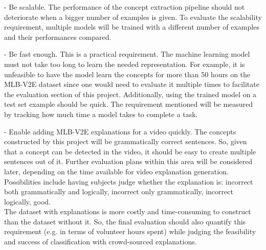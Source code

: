  - Be scalable. The performance of the concept extraction pipeline should not deteriorate when a bigger number of examples is given. To evaluate the scalability requirement, multiple models will be trained with a different number of examples and their performances compared.
 
 - Be fast enough. This is a practical requirement. The machine learning model must not take too long to learn the needed representation. For example, it is unfeasible to have the model learn the concepts for more than 50 hours on the MLB-V2E dataset since one would need to evaluate it multiple times to facilitate the evaluation section of this project. Additionally, using the trained model on a test set example should be quick. The requirement mentioned will be measured by tracking how much time a model takes to complete a task.
 
 - Enable adding MLB-V2E explanations for a video quickly. The concepts constructed by this project will be grammatically correct sentences. So, given that a concept can be detected in the video, it should be easy to create multiple sentences out of it. Further evaluation plans within this area will be considered later, depending on the time available for video explanation generation. Possibilities include having subjects judge whether the explanation is: incorrect both grammatically and logically, incorrect only grammatically, incorrect logically, good.\\
 
The dataset with explanations is more costly and time-consuming to construct than the dataset without it.
So, the final evaluation should also quantify this requirement (e.g. in terms of volunteer hours spent) while judging the feasibility and success of classification with crowd-sourced explanations.